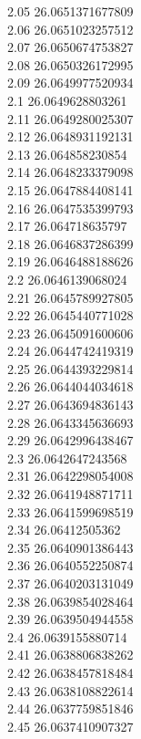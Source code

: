 {2.05	26.0651371677809\\
2.06	26.0651023257512\\
2.07	26.0650674753827\\
2.08	26.0650326172995\\
2.09	26.0649977520934\\
2.1	26.0649628803261\\
2.11	26.0649280025307\\
2.12	26.0648931192131\\
2.13	26.064858230854\\
2.14	26.0648233379098\\
2.15	26.0647884408141\\
2.16	26.0647535399793\\
2.17	26.064718635797\\
2.18	26.0646837286399\\
2.19	26.0646488188626\\
2.2	26.0646139068024\\
2.21	26.0645789927805\\
2.22	26.0645440771028\\
2.23	26.0645091600606\\
2.24	26.0644742419319\\
2.25	26.0644393229814\\
2.26	26.0644044034618\\
2.27	26.0643694836143\\
2.28	26.0643345636693\\
2.29	26.0642996438467\\
2.3	26.0642647243568\\
2.31	26.0642298054008\\
2.32	26.0641948871711\\
2.33	26.0641599698519\\
2.34	26.06412505362\\
2.35	26.0640901386443\\
2.36	26.0640552250874\\
2.37	26.0640203131049\\
2.38	26.0639854028464\\
2.39	26.0639504944558\\
2.4	26.0639155880714\\
2.41	26.0638806838262\\
2.42	26.0638457818484\\
2.43	26.0638108822614\\
2.44	26.0637759851846\\
2.45	26.0637410907327\\
}
